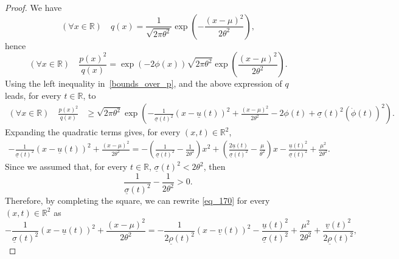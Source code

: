 \documentclass[review]{elsarticle}
\begin{document}
{\begin{proof}
We have
$$
(\forall x \in \mathbb{R}) \quad q(x)=\frac{1}{\sqrt{2\pi \theta^2}}
\exp\left(-\frac{(x-\mu)^2}{2\theta^2}\right),
$$
hence
\begin{equation}
(\forall x \in \mathbb{R}) \quad
\frac{p(x)^2}{q(x)}
=
\exp(-2\phi(x))\sqrt{2\pi \theta^2}
\exp\left(\frac{(x-\mu)^2}{2\theta^2}\right).
\end{equation}
Using the left inequality in~\eqref{bounds_over_p}, and the above expression of $q$ leads, for every $t \in \mathbb{R}$, to
\begin{align}
(\forall x \in \mathbb{R}) \quad \frac{p(x)^2}{q(x)}
&\geq
\sqrt{2\pi \theta^2}
\exp\left(
-\frac{1}{\underline{\sigma}(t)^2}(x-\underline{u}(t))^2
+\frac{(x-\mu)^2}{2\theta^2}
-2\phi(t)
+\underline{\sigma}(t)^2(\dot{\phi}(t))^2
\right).
\end{align}
Expanding the quadratic terms gives, for every $(x,t) \in \mathbb{R}^2$,
\begin{multline}
-\frac{1}{\underline{\sigma}(t)^2}(x-\underline{u}(t))^2
+\frac{(x-\mu)^2}{2\theta^2}
=
-\left(
\frac{1}{\underline{\sigma}(t)^2}
-\frac{1}{2\theta^2}
\right)x^2
+
\left(
\frac{2\underline{u}(t)}{\underline{\sigma}(t)^2}
-\frac{\mu}{\theta^2}
\right)x  
-\frac{\underline{u}(t)^2}{\underline{\sigma}(t)^2}
+\frac{\mu^2}{2\theta^2}.
\label{eq_170}
\end{multline}
Since we assumed that, for every $t \in \mathbb{R}$, $\underline{\sigma}(t)^2<2\theta^2$, then
$$
\frac{1}{\underline{\sigma}(t)^2}-\frac{1}{2\theta^2}>0.
$$
Therefore, by completing the square, we can rewrite \eqref{eq_170} for every $(x,t) \in \mathbb{R}^2$ as
\begin{equation}
-\frac{1}{\underline{\sigma}(t)^2}(x-\underline{u}(t))^2
+\frac{(x-\mu)^2}{2\theta^2}
=
-\frac{1}{2\underline{\rho}(t)^2}(x-\underline{v}(t))^2
-\frac{\underline{u}(t)^2}{\underline{\sigma}(t)^2}
+\frac{\mu^2}{2\theta^2}
+\frac{\underline{v}(t)^2}{2\underline{\rho}(t)^2},

\end{equation}
\end{proof}}
\end{document}
